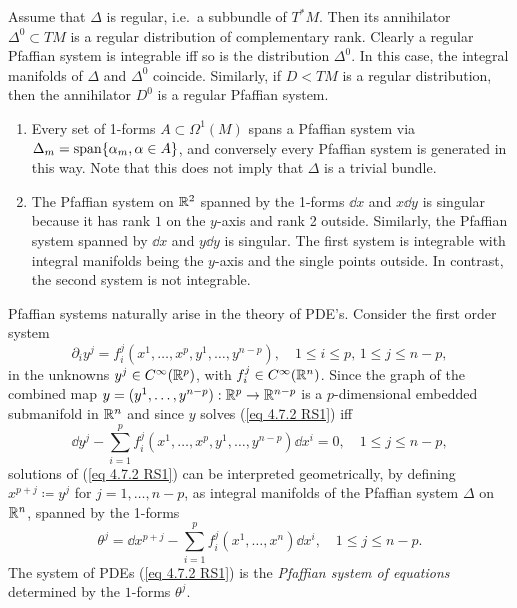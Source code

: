 \begin{rem}
    Assume that $\Delta$ is regular, i.e.~a subbundle of $T^\ast M$. Then its annihilator $\Delta^0\subset TM$ is a regular distribution of complementary rank. Clearly a regular Pfaffian system is integrable iff so is the distribution $\Delta^0$. In this case, the integral manifolds of $\Delta$ and $\Delta^0$ coincide. Similarly, if $D< TM$ is a regular distribution, then the annihilator $D^0$ is a regular Pfaffian system.
\end{rem}

\begin{example}
    \begin{enumerate}
        \item Every set of 1-forms $A\subset \Omega^1(M)$ spans a Pfaffian system via $\Delta_m=\operatorname{span}\{\alpha_m,\alpha\in A\}$, and conversely every Pfaffian system is generated in this way. Note that this does not imply that $\Delta$ is a trivial bundle.
        \item The Pfaffian system on $\mathbb{R}^2$ spanned by the 1-forms $\dd x$ and $x\dd y$ is singular because it has rank $1$ on the $y$-axis and rank 2 outside. Similarly, the Pfaffian system spanned by $\dd x$ and $y\dd y$ is singular. The first system is integrable with integral manifolds being the $y$-axis and the single points outside. In contrast, the second system is not integrable.
    \end{enumerate}
\end{example}

Pfaffian systems naturally arise in the theory of PDE's. Consider the first order system
\[\partial_i y^j=f_i^j(x^1,\ldots,x^p,y^1,\ldots,y^{n-p}),\quad 1\leq i\leq p,\,1\leq j\leq n-p,\label{eq 4.7.2 RS1}\]
in the unknowns $y^j\in C^\infty(\mathbb{R}^p)$, with $f_i^j\in C^\infty(\mathbb{R}^n)$. Since the graph of the combined map $y=(y^1,\ldots,y^{n-p}):\mathbb{R}^p\to \mathbb{R}^{n-p}$ is a $p$-dimensional embedded submanifold in $\mathbb{R}^n$ and since $y$ solves (\ref{eq 4.7.2 RS1}) iff
\[\dd y^j-\sum_{i=1}^p f_i^j(x^1,\ldots,x^p,y^1,\ldots,y^{n-p})\dd x^i=0,\quad 1\leq j\leq n-p,\]
solutions of (\ref{eq 4.7.2 RS1}) can be interpreted geometrically, by defining $x^{p+j}\coloneqq y^j$ for $j=1,\ldots,n-p$, as integral manifolds of the Pfaffian system $\Delta$ on $\mathbb{R}^n$, spanned by the 1-forms
\[\theta^j=\dd x^{p+j}-\sum_{i=1}^p f_i^j(x^1,\ldots,x^n)\dd x^i,\quad 1\leq j\leq n-p.\]
The system of PDEs (\ref{eq 4.7.2 RS1}) is the \emph{Pfaffian system of equations} determined by the $1$-forms $\theta^j$.

